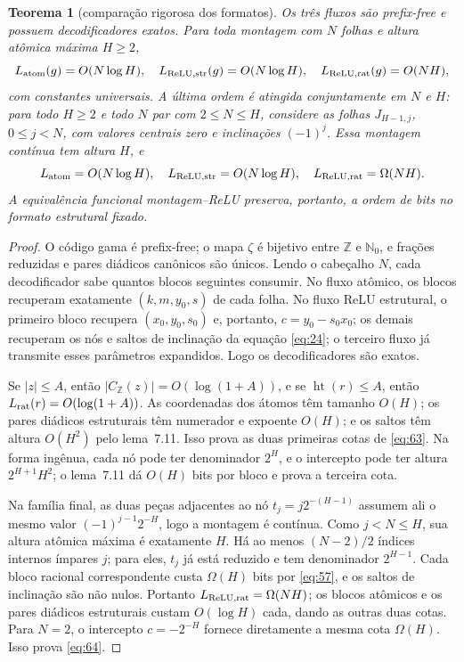 \documentclass[11pt,a4paper]{article}
\theoremstyle{preciso}
\newtheorem{teorema}{Teorema}[section]
\theoremstyle{definition}
\newcommand{\N}{\mathbb N}
\newcommand{\Z}{\mathbb Z}
\newcommand{\heightq}{\operatorname{ht}}
\newcommand{\eqn}[2]{\begin{equation}\label{eq:#1}#2\end{equation}}
\begin{document}
\begin{teorema}[comparação rigorosa dos formatos]
Os três fluxos são prefix-free e possuem decodificadores exatos. Para toda montagem com $N$ folhas e altura atômica máxima $H\ge2$,
\eqn{63}{L_{\rm atom}(g)=O(N\log H),\quad L_{\rm ReLU,str}(g)=O(N\log H),\quad
L_{\rm ReLU,rat}(g)=O(NH),}
com constantes universais. A última ordem é atingida conjuntamente em $N$ e $H$: para todo $H\ge2$ e todo $N$ par com $2\le N\le H$, considere as folhas $J_{H-1,j}$, $0\le j<N$, com valores centrais zero e inclinações $(-1)^j$. Essa montagem contínua tem altura $H$, e
\eqn{64}{L_{\rm atom}=O(N\log H),\quad L_{\rm ReLU,str}=O(N\log H),\quad
L_{\rm ReLU,rat}=\Omega(NH).}
A equivalência funcional montagem--ReLU preserva, portanto, a ordem de bits no formato estrutural fixado.
\end{teorema}
\begin{proof}
O código gama é prefix-free; o mapa $\zeta$ é bijetivo entre $\Z$ e $\N_0$, e frações reduzidas e pares diádicos canônicos são únicos. Lendo o cabeçalho $N$, cada decodificador sabe quantos blocos seguintes consumir. No fluxo atômico, os blocos recuperam exatamente $(k,m,y_0,s)$ de cada folha. No fluxo ReLU estrutural, o primeiro bloco recupera $(x_0,y_0,s_0)$ e, portanto, $c=y_0-s_0x_0$; os demais recuperam os nós e saltos de inclinação da equação \eqref{eq:24}; o terceiro fluxo já transmite esses parâmetros expandidos. Logo os decodificadores são exatos.

Se $|z|\le A$, então $|C_{\Z}(z)|=O(\log(1+A))$, e se $\heightq(r)\le A$, então $L_{\rm rat}(r)=O(\log(1+A))$. As coordenadas dos átomos têm tamanho $O(H)$; os pares diádicos estruturais têm numerador e expoente $O(H)$; e os saltos têm altura $O(H^2)$ pelo lema~7.11. Isso prova as duas primeiras cotas de \eqref{eq:63}. Na forma ingênua, cada nó pode ter denominador $2^H$, e o intercepto pode ter altura $2^{H+1}H^2$; o lema~7.11 dá $O(H)$ bits por bloco e prova a terceira cota.

Na família final, as duas peças adjacentes ao nó $t_j=j2^{-(H-1)}$ assumem ali o mesmo valor $(-1)^{j-1}2^{-H}$, logo a montagem é contínua. Como $j<N\le H$, sua altura atômica máxima é exatamente $H$. Há ao menos $(N-2)/2$ índices internos ímpares $j$; para eles, $t_j$ já está reduzido e tem denominador $2^{H-1}$. Cada bloco racional correspondente custa $\Omega(H)$ bits por \eqref{eq:57}, e os saltos de inclinação são não nulos. Portanto $L_{\rm ReLU,rat}=\Omega(NH)$; os blocos atômicos e os pares diádicos estruturais custam $O(\log H)$ cada, dando as outras duas cotas. Para $N=2$, o intercepto $c=-2^{-H}$ fornece diretamente a mesma cota $\Omega(H)$. Isso prova \eqref{eq:64}.
\end{proof}
\end{document}
